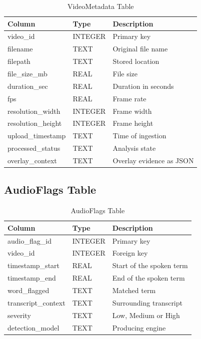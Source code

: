 \documentclass[12pt,a4paper,twoside]{report}
\begin{document}
\begin{table}[h]
\centering
\begin{tabular}{|p{4cm}|p{2.5cm}|p{5cm}|}
\hline
\textbf{Column} & \textbf{Type} & \textbf{Description} \\
\hline
video\_id & INTEGER & Primary key \\
\hline
filename & TEXT & Original file name \\
\hline
filepath & TEXT & Stored location \\
\hline
file\_size\_mb & REAL & File size \\
\hline
duration\_sec & REAL & Duration in seconds \\
\hline
fps & REAL & Frame rate \\
\hline
resolution\_width & INTEGER & Frame width \\
\hline
resolution\_height & INTEGER & Frame height \\
\hline
upload\_timestamp & TEXT & Time of ingestion \\
\hline
processed\_status & TEXT & Analysis state \\
\hline
overlay\_context & TEXT & Overlay evidence as JSON \\
\hline
\end{tabular}
\caption{VideoMetadata Table}
\end{table}

\subsection{AudioFlags Table}

\begin{table}[h]
\centering
\begin{tabular}{|p{4cm}|p{2.5cm}|p{5cm}|}
\hline
\textbf{Column} & \textbf{Type} & \textbf{Description} \\
\hline
audio\_flag\_id & INTEGER & Primary key \\
\hline
video\_id & INTEGER & Foreign key \\
\hline
timestamp\_start & REAL & Start of the spoken term \\
\hline
timestamp\_end & REAL & End of the spoken term \\
\hline
word\_flagged & TEXT & Matched term \\
\hline
transcript\_context & TEXT & Surrounding transcript \\
\hline
severity & TEXT & Low, Medium or High \\
\hline
detection\_model & TEXT & Producing engine \\
\hline
\end{tabular}
\caption{AudioFlags Table}
\end{table}
\end{document}
